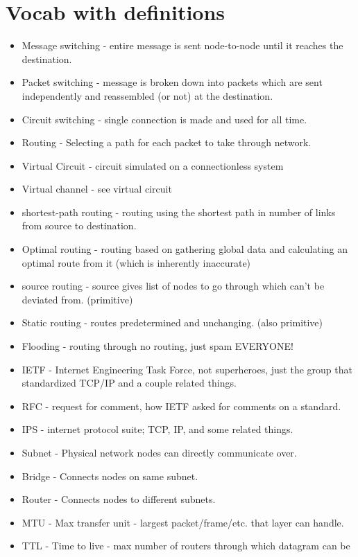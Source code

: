 \documentclass{scrartcl}
\begin{document}
\section*{Vocab with definitions}
\begin{itemize}
\item Message switching - entire message is sent node-to-node until it reaches
the destination.
\item Packet switching - message is broken down into packets which are sent
independently and reassembled (or not) at the destination.
\item Circuit switching - single connection is made and used for all time.
\item Routing - Selecting a path for each packet to take through network.
\item Virtual Circuit - circuit simulated on a connectionless system
\item Virtual channel - see virtual circuit
\item shortest-path routing - routing using the shortest path in number of links
from source to destination.
\item Optimal routing - routing based on gathering global data and calculating
an optimal route from it (which is inherently inaccurate)
\item source routing - source gives list of nodes to go through which can't
be deviated from. (primitive)
\item Static routing - routes predetermined and unchanging. (also primitive)
\item Flooding - routing through no routing, just spam EVERYONE!
\item IETF - Internet Engineering Task Force, not superheroes, just the group 
that standardized TCP/IP and a couple related things.
\item RFC - request for comment, how IETF asked for comments on a standard.
\item IPS - internet protocol suite; TCP, IP, and some related things.
\item Subnet - Physical network nodes can directly communicate over.
\item Bridge - Connects nodes on same subnet.
\item Router - Connects nodes to different subnets.
\item MTU - Max transfer unit - largest packet/frame/etc. that layer can handle.
\item TTL - Time to live - max number of routers through which datagram can be

\end{itemize}
\end{document}
